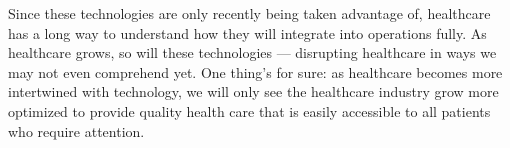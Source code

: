 \documentclass[12pt]{article}
\begin{document}
\indent
Since these technologies are only recently being taken advantage of, healthcare has a long way to understand how they will integrate into operations fully. As healthcare grows, so will these technologies — disrupting healthcare in ways we may not even comprehend yet. One thing’s for sure: as healthcare becomes more intertwined with technology, we will only see the healthcare industry grow more optimized to provide quality health care that is easily accessible to all patients who require attention.
\end{document}
